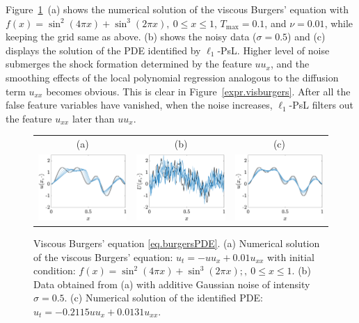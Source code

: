 \documentclass[a4paper,11pt]{article}
\theoremstyle{definition}
\begin{document}
Figure~\ref{fig.visburgers}~(a) shows the numerical solution of the viscous Burgers' equation with $f(x)=\sin^2(4\pi x)+\sin^3(2\pi x),~0\leq x\leq 1$, $T_{\max}=0.1$, and $\nu=0.01$, while keeping the grid same as above. (b) shows the noisy data ($\sigma=0.5$) and (c) displays the  solution of the PDE identified by $\ell_1$-PsL. Higher level of noise submerges the shock formation determined by the feature $uu_x$, and the smoothing effects of the local polynomial regression analogous to the diffusion term $u_{xx}$ becomes obvious. This is clear in Figure~\ref{expr.visburgers}. After all the false feature variables have vanished, when the noise increases, $\ell_1$-PsL filters out the feature $u_{xx}$ later than $uu_x$.
\begin{figure}
\centering
\begin{tabular}{ccc}
(a)&(b)&(c)\\
\includegraphics[width=2in]{Figures/visburgers_sol.eps}&
\includegraphics[width=2in]{Figures/visburgers_noise.eps}&
\includegraphics[width=2in]{Figures/visburgers_resimul.eps}
\end{tabular}
\caption{Viscous Burgers' equation \eqref{eq.burgersPDE}. (a) Numerical solution of the viscous Burgers' equation: $u_t=-uu_{x}+0.01u_{xx}$ with initial condition: $f(x)=\sin^2(4\pi x)+\sin^3(2\pi x);,~0\leq x\leq 1$. (b) Data obtained from (a) with additive Gaussian noise of intensity $\sigma=0.5$. (c) Numerical solution of the identified PDE: $u_t=-0.2115uu_{x}+0.0131u_{xx}$. }	\label{fig.visburgers}
\end{figure}
\end{document}
